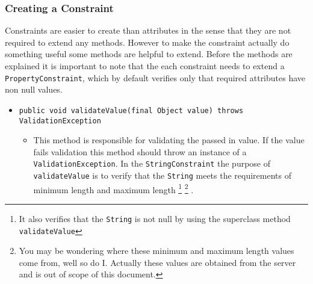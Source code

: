 \documentclass[10pt,letterpaper,onecolumn,oneside]{report}
\begin{document}
\subsubsection{Creating a Constraint}
Constraints are easier to create than attributes in the sense that they are not
required to extend any methods.  However to make the constraint actually do
something useful some methods are helpful to extend.  Before the methods
are explained it is important to note that the each constraint needs to extend
a \texttt{PropertyConstraint}, which by default verifies only that required
attributes have non null values.
\begin{itemize}
\item \texttt{public void validateValue(final Object value) throws 
ValidationException}
\begin{itemize}
\item This method is responsible for validating the passed in value.  If the
value fails validation this method should throw an instance of a
\texttt{ValidationException}.  In the \texttt{StringConstraint} the purpose
of \texttt{validateValue} is to verify that the \texttt{String} meets the
requirements of minimum length and maximum length
\footnote{It also verifies that the \texttt{String} is not null by using the superclass method \texttt{validateValue}}
\footnote{You may be wondering where these minimum and maximum length values 
come from, well so do I.  Actually these values are obtained from the server
and is out of scope of this document.}
.
\end{itemize}
\end{itemize}
\end{document}

